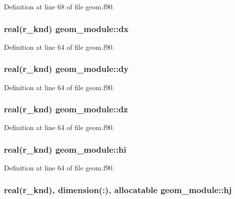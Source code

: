 Definition at line 68 of file geom.\-f90.

\hypertarget{classgeom__module_a2f292c19b0e9bfc4cde1d54f0e9d4472}{
\subsubsection[{dx}]{\setlength{\rightskip}{0pt plus 5cm}real(r\-\_\-knd) geom\-\_\-module\-::dx}}\label{classgeom__module_a2f292c19b0e9bfc4cde1d54f0e9d4472}


Definition at line 64 of file geom.\-f90.

\hypertarget{classgeom__module_a13234163c83c1041d8053ab0f4ea5d40}{
\subsubsection[{dy}]{\setlength{\rightskip}{0pt plus 5cm}real(r\-\_\-knd) geom\-\_\-module\-::dy}}\label{classgeom__module_a13234163c83c1041d8053ab0f4ea5d40}


Definition at line 64 of file geom.\-f90.

\hypertarget{classgeom__module_a59842db695f66127f749bffd9df2f034}{
\subsubsection[{dz}]{\setlength{\rightskip}{0pt plus 5cm}real(r\-\_\-knd) geom\-\_\-module\-::dz}}\label{classgeom__module_a59842db695f66127f749bffd9df2f034}


Definition at line 64 of file geom.\-f90.

\hypertarget{classgeom__module_af657687714307a2bfe5e99ea8ee9f35e}{
\subsubsection[{hi}]{\setlength{\rightskip}{0pt plus 5cm}real(r\-\_\-knd) geom\-\_\-module\-::hi}}\label{classgeom__module_af657687714307a2bfe5e99ea8ee9f35e}


Definition at line 64 of file geom.\-f90.

\hypertarget{classgeom__module_ad5db4c62807a7025e92dd2c5742156eb}{
\subsubsection[{hj}]{\setlength{\rightskip}{0pt plus 5cm}real(r\-\_\-knd), dimension(\-:), allocatable geom\-\_\-module\-::hj}}\label{classgeom__module_ad5db4c62807a7025e92dd2c5742156eb}


